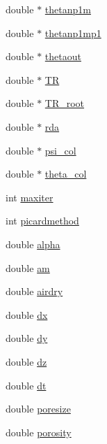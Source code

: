 \begin{DoxyCompactItemize}
double $\ast$ \hyperlink{class_subsurface_flow_class_a0021e0058904b23dbd9b8c88170dfda0}{thetanp1m}
\item 
double $\ast$ \hyperlink{class_subsurface_flow_class_a90246f60b5fc8ac96307fb24ba25c818}{thetanp1mp1}
\item 
double $\ast$ \hyperlink{class_subsurface_flow_class_a21e72756de35664f5d7cc47eb794819d}{thetaout}
\item 
double $\ast$ \hyperlink{class_subsurface_flow_class_a8d02452fa0d497e798d3e490bfb9d6d4}{TR}
\item 
double $\ast$ \hyperlink{class_subsurface_flow_class_ab1dbf63ff09d6b99ab59281f9d22a4b3}{T\+R\+\_\+root}
\item 
double $\ast$ \hyperlink{class_subsurface_flow_class_a9ec3c65ca7cad0b9ac095581b8c64e31}{rda}
\item 
double $\ast$ \hyperlink{class_subsurface_flow_class_aea98e01aaebd598ccd23dbd87e9f8321}{psi\+\_\+col}
\item 
double $\ast$ \hyperlink{class_subsurface_flow_class_a3d84bba894a0b1662ead90633396cd6c}{theta\+\_\+col}
\item 
int \hyperlink{class_subsurface_flow_class_a7a0ea1cef446572066087274bba14772}{maxiter}
\item 
int \hyperlink{class_subsurface_flow_class_a75fcecddc45d10001a2747b060f2fb47}{picardmethod}
\item 
double \hyperlink{class_subsurface_flow_class_a30dae2b3bb6dabb3a3238e761672c205}{alpha}
\item 
double \hyperlink{class_subsurface_flow_class_a6a77e82eeb16d39be72f1ed253070602}{am}
\item 
double \hyperlink{class_subsurface_flow_class_a447d38965e672eb28361bfc29c697791}{airdry}
\item 
double \hyperlink{class_subsurface_flow_class_ad9df806202cd4abd0ca54c88d5199725}{dx}
\item 
double \hyperlink{class_subsurface_flow_class_a42f022e5e25231bfe6eed95c986120b6}{dy}
\item 
double \hyperlink{class_subsurface_flow_class_a23f9446b867cf5dfa7203443fbacf340}{dz}
\item 
double \hyperlink{class_subsurface_flow_class_a32de728928554bf179995d21d4917811}{dt}
\item 
double \hyperlink{class_subsurface_flow_class_a049008e31d0908ccad5a54cc475e99b3}{poresize}
\item 
double \hyperlink{class_subsurface_flow_class_a604f5e8101e66c91dade38981e9a7b02}{porosity}

\end{DoxyCompactItemize}
